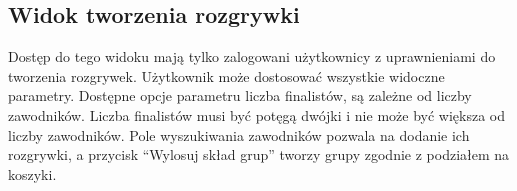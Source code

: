 \documentclass[shortabstract]{iithesis}
\begin{document}
\subsection{Widok tworzenia rozgrywki}
Dostęp do tego widoku mają tylko zalogowani użytkownicy z uprawnieniami do tworzenia rozgrywek.
Użytkownik może dostosować wszystkie widoczne parametry. Dostępne opcje parametru liczba finalistów, są zależne od liczby zawodników.
Liczba finalistów musi być potęgą dwójki i nie może być większa od liczby zawodników.
Pole wyszukiwania zawodników pozwala na dodanie ich rozgrywki, a przycisk ``Wylosuj skład grup'' tworzy grupy zgodnie z podziałem na koszyki.
\newpage
\begin{figure}[H]
    \centering
    \hfill
\end{figure}
\end{document}
